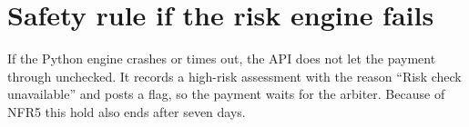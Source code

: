 \section{Safety rule if the risk engine fails}
If the Python engine crashes or times out, the API does not let the payment through unchecked. It records a high-risk assessment with the reason ``Risk check unavailable'' and posts a flag, so the payment waits for the arbiter. Because of NFR5 this hold also ends after seven days.
